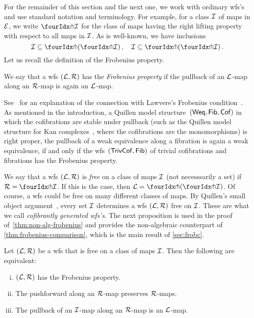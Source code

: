 \documentclass[reqno,10pt,a4paper,oneside,draft]{amsart}
\begin{document}
For the remainder of this section and the next one, we work with ordinary wfs's~\cite{bousfield-wfs} and use standard notation and terminology.
For example, for a class $\cal{I}$ of maps in $\cal{E}$, we write $\liftr{\cal{I}}$ for the class of maps having the right lifting property with respect to all maps in $\cal{I}$.
As is well-known, we have inclusions
\begin{equation} \label{equ:inclus-orthog}
\cal{I} \subseteq \liftl{(\liftr{\cal{I}})}
\, , \quad
\cal{I} \subseteq \liftr{(\liftl{\cal{I}})}
\, .\end{equation}
Let us recall the definition of the Frobenius property.

\begin{definition}
We say that a wfs $(\cal{L}, \cal{R})$ has the \emph{Frobenius property} if the pullback of an $\cal{L}$-map along an 
$\cal{R}$-map is again an $\cal{L}$-map.
\end{definition}

See~\cite{clementino:frobenius} for an explanation of the connection with Lawvere's Frobenius condition~\cite{lawvere-equality}.
As mentioned in the introduction, a Quillen model structure~$(\mathsf{Weq}, \Fib, \Cof)$ in which the cofibrations are stable under pullback (such as the Quillen model structure for Kan complexes~\cite{quillen-homotopical}, where the cofibrations are the monomorphisms) is right proper, \ie the pullback of a weak equivalence along a fibration is again a weak equivalence, if and only if the wfs~$(\TrivCof, \Fib)$ of trivial cofibrations and fibrations has the Frobenius property.

We say that a wfs $(\cal{L}, \cal{R})$ is \emph{free} on a class of maps $\cal{I}$ (not necesssarily a set) if 
$\cal{R} = \liftr{\cal{I}}$.
If this is the case, then $\cal{L} = \liftl{(\liftr{\cal{I}})}$.
Of course, a wfs could be free on many different classes of maps.
By Quillen's small object argument~\cite{quillen-homotopical}, every set $\cal{I}$ determines a wfs $(\cal{L}, 
\cal{R})$ free on $\cal{I}$.
These are what we call \emph{cofibrantly generated wfs's}.
The next proposition is used in the proof of~\cref{thm:non-alg-frobenius} and provides the non-algebraic counterpart of \cref{thm:frobenius-comparison}, which is the main result of \cref{sec:frobc}.

\begin{proposition} \label{thm:frobenius-equivalence}
Let $(\cal{L}, \cal{R})$ be a wfs that is free on a class of maps $\cal{I}$.
Then the following are equivalent:
\begin{enumerate}[(i)]
\item $(\cal{L}, \cal{R})$  has the Frobenius property.
\item The pushforward along an $\cal{R}$-map preserves $\cal{R}$-maps.
\item The pullback of an $\cal{I}$-map along an $\cal{R}$-map is an $\cal{L}$-map.
\end{enumerate}
\end{proposition}
\end{document}
